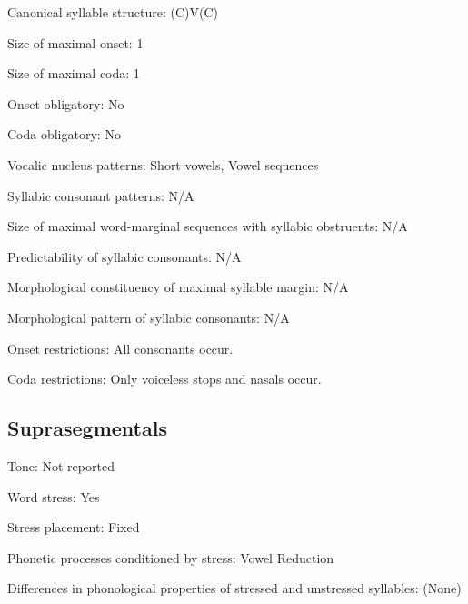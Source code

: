 {\begin{appendixdesc}
\item[Canonical syllable structure:] (C)V(C) \citep[14--18]{McElhanon1970}

\item[Size of maximal onset:] 1

\item[Size of maximal coda:] 1

\item[Onset obligatory:] No

\item[Coda obligatory:] No

\item[Vocalic nucleus patterns:] Short vowels, Vowel sequences

\item[Syllabic consonant patterns:] N/A

\item[Size of maximal word-marginal sequences with syllabic obstruents:] N/A

\item[Predictability of syllabic consonants:] N/A

\item[Morphological constituency of maximal syllable margin:] N/A

\item[Morphological pattern of syllabic consonants:] N/A

\item[Onset restrictions:] All consonants occur.

\item[Coda restrictions:] Only voiceless stops and nasals occur.
\end{appendixdesc}
\subsection*{Suprasegmentals}
\begin{appendixdesc}
\item[Tone:] Not reported

\item[Word stress:] Yes

\item[Stress placement:] Fixed

\item[Phonetic processes conditioned by stress:] Vowel Reduction

\item[Differences in phonological properties of stressed and unstressed syllables:] (None)


\end{appendixdesc}}
